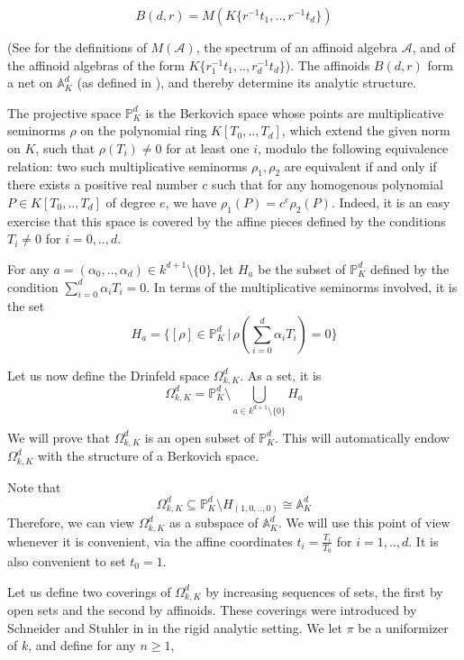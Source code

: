 \documentclass{amsart}
\theoremstyle{theorem}
\theoremstyle{lemma}
\theoremstyle{prop}
\theoremstyle{definition}
\theoremstyle{corollary}
\theoremstyle{remark}
\newcommand{\A}{\mathbb{A}}
\newcommand{\PR}{\mathbb{P}}
\begin{document}
$$B(d,r)=M(K\{r^{-1}t_1,..,r^{-1}t_{d}\})$$ 

(See \cite{ber2} for the definitions of $M(\mathcal A)$, the spectrum of an affinoid algebra $\mathcal A$, and of the affinoid algebras of the form $K\{r_1^{-1}t_1,..,r_d^{-1}t_d\}$). The affinoids $B(d,r)$ form a net on $\A^{d}_{K}$ (as defined in \cite{ber4}), and thereby determine its analytic structure. 

The projective space $\PR^{d}_K$ is the Berkovich space whose points are multiplicative seminorms $\rho$ on the polynomial ring $K[T_0,..,T_{d}]$, which extend the given norm on $K$, such that $\rho(T_i)\neq 0$ for at least one $i$, modulo the following equivalence relation: two such multiplicative seminorms $\rho_1, \rho_2$ are equivalent if and only if there exists a positive real number $c$ such that for any homogenous polynomial $P\in K[T_0,..,T_{d}]$ of degree $e$, we have $\rho_1(P)=c^e \rho_2(P)$. Indeed, it is an easy exercise that this space is covered by the affine pieces defined by the conditions $T_i \neq 0$ for $i=0,..,d$.

For any $a=(\alpha_0,..,\alpha_{d})\in k^{d+1} \setminus \{0 \}$, let $H_a$ be the subset of $\mathbb P^{d}_K$ defined by the condition $\sum_{i=0}^{d}{\alpha_i T_i}=0$. In terms of the multiplicative seminorms involved, it is the set $$H_a= \big \{[\rho] \in \PR^{d}_K \,| \,   \rho(\sum_{i=0}^{d}{\alpha_i T_i})=0 \big \}$$

Let us now define the Drinfeld space $\Omega^{d}_{k,K}$. As a set, it is
$$  \Omega^{d}_{k,K} = \PR^{d}_K \setminus \bigcup_{a\in k^{d+1} \setminus \{0 \}}H_a $$ 

We will prove that $\Omega^{d}_{k,K}$ is an open subset of  $\PR^{d}_K$. This will automatically endow  $\Omega^{d}_{k,K}$ with the structure of a Berkovich space.

Note that $$  \Omega^{d}_{k,K} \subseteq \PR^{d}_K \setminus H_{(1,0,..,0)}\cong \A^{d}_K$$ Therefore, we can view $  \Omega^{d}_{k,K}$ as a subspace of $\A^{d}_K$. We will use this point of view whenever it is convenient, via the affine coordinates $t_i=\frac{T_i}{T_0}$ for $i=1,..,d$. It is also convenient to set $t_0=1$.

Let us define two coverings of $\Omega^{d}_{k,K}$ by increasing sequences of sets, the first by open sets and the second by affinoids. These coverings were introduced by Schneider and Stuhler in \cite{ss} in the rigid analytic setting. We let $\pi$ be a uniformizer of $k$, and define for any $n\geq 1$,
\end{document}
